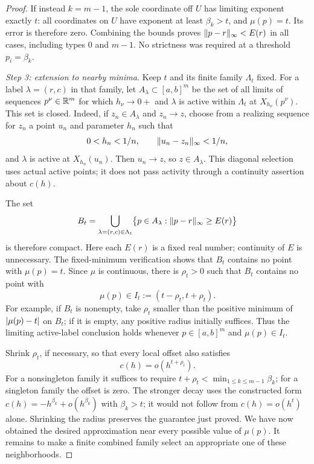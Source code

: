 \begin{proof}
If instead $k=m-1$, the sole coordinate off $U$ has limiting exponent
exactly $t$: all coordinates on $U$ have exponent at least
$\beta_k>t$, and $\mu(p)=t$.  Its error is therefore zero.  Combining
the bounds proves $\lVert p-r\rVert_\infty<E(r)$ in all cases, including
types $0$ and $m-1$.  No strictness was required at a threshold
$p_i=\beta_k$.

\medskip
\noindent\emph{Step 3: extension to nearby minima.}
Keep $t$ and its finite family $\Lambda_t$ fixed.  For a label
$\lambda=(r,c)$ in that family, let $A_\lambda\subset[a,b]^m$ be the
set of all limits of sequences $p^\nu\in\mathbb R^m$ for which
$h_\nu\to0+$ and $\lambda$ is active within $\Lambda_t$ at
$X_{h_\nu}(p^\nu)$.
This set is closed.  Indeed, if $z_n\in A_\lambda$ and $z_n\to z$,
choose from a realizing sequence for $z_n$ a point $u_n$ and parameter
$h_n$ such that
\[
  0<h_n<1/n,\qquad \lVert u_n-z_n\rVert_\infty<1/n,
\]
and $\lambda$ is active at $X_{h_n}(u_n)$.  Then $u_n\to z$, so
$z\in A_\lambda$. This diagonal selection uses actual active points;
it does not pass activity through a continuity assertion about $c(h)$.

The set
\[
  B_t=\bigcup_{\lambda=(r,c)\in\Lambda_t}
  \bigl\{p\in A_\lambda:\lVert p-r\rVert_\infty\geq E(r)\bigr\}
\]
is therefore compact.  Here each $E(r)$ is a fixed real number;
continuity of $E$ is unnecessary.  The fixed-minimum verification shows
that $B_t$ contains no point with $\mu(p)=t$.  Since $\mu$ is continuous,
there is $\rho_t>0$ such that $B_t$ contains no point with
\[
  \mu(p)\in I_t:=(t-\rho_t,t+\rho_t).
\]
For example, if $B_t$ is nonempty, take $\rho_t$ smaller than the
positive minimum of $\lvert\mu(p)-t\rvert$ on $B_t$; if it is empty, any
positive radius initially suffices.  Thus the limiting active-label
conclusion holds whenever $p\in[a,b]^m$ and $\mu(p)\in I_t$.

Shrink $\rho_t$, if necessary, so that every local offset also satisfies
\begin{equation}
  c(h)=o(h^{t+\rho_t}).
  \label{eq:affine-local-decay}
\end{equation}
For a nonsingleton family it suffices to require
$t+\rho_t<\min_{1\leq k\leq m-1}\beta_k$; for a singleton family the
offset is zero. The stronger decay uses the constructed form
$c(h)=-h^{\beta_k}+o(h^{\beta_k})$ with $\beta_k>t$; it would not follow
from $c(h)=o(h^t)$ alone. Shrinking the radius preserves the guarantee
just proved.
We have now obtained the desired approximation near every possible value
of $\mu(p)$.  It remains to make a finite combined family select an
appropriate one of these neighborhoods.


\end{proof}
